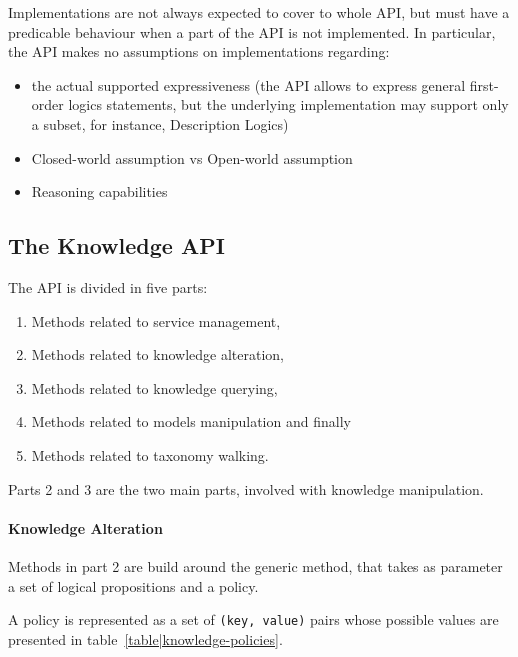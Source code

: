 Implementations are not always expected to cover to whole API, but must have a
predicable behaviour when a part of the API is not implemented. In particular,
the API makes no assumptions on implementations regarding:

\begin{itemize}
    \item  the actual supported expressiveness (the API allows to express
    general first-order logics statements, but the underlying implementation
    may support only a subset, for instance, Description Logics)
    \item  Closed-world assumption vs Open-world assumption
    \item  Reasoning capabilities
\end{itemize}

\subsection{The Knowledge API}

The API is divided in five parts:
\begin{enumerate}
    \item Methods related to service management,
    \item Methods related to knowledge alteration,
    \item Methods related to knowledge querying,
    \item Methods related to models manipulation and finally
    \item Methods related to taxonomy walking.
\end{enumerate}

Parts 2 and 3 are the two main parts, involved with knowledge manipulation.

\paragraph{Knowledge Alteration} Methods in part 2 are build around the generic
 method, that takes as parameter a set of logical propositions
and a policy.

A policy is represented as a set of \texttt{(key, value)} pairs whose possible
values are presented in table~\ref{table|knowledge-policies}.

